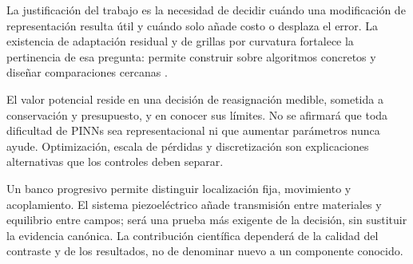 \label{sec:justificacion}
La justificación del trabajo es la necesidad de decidir cuándo una modificación de representación resulta útil y cuándo solo añade costo o desplaza el error. La existencia de adaptación residual y de grillas por curvatura fortalece la pertinencia de esa pregunta: permite construir sobre algoritmos concretos y diseñar comparaciones cercanas \cite{wu2023sampling,rigas2026,leong2026}.

El valor potencial reside en una decisión de reasignación medible, sometida a conservación y presupuesto, y en conocer sus límites. No se afirmará que toda dificultad de PINNs sea representacional ni que aumentar parámetros nunca ayude. Optimización, escala de pérdidas y discretización son explicaciones alternativas que los controles deben separar.

Un banco progresivo permite distinguir localización fija, movimiento y acoplamiento. El sistema piezoeléctrico añade transmisión entre materiales y equilibrio entre campos; será una prueba más exigente de la decisión, sin sustituir la evidencia canónica. La contribución científica dependerá de la calidad del contraste y de los resultados, no de denominar nuevo a un componente conocido.
